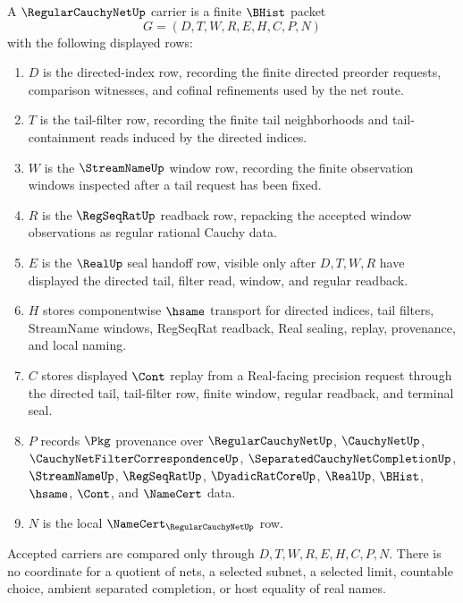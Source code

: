\begin{definition}
\label{def:regular-cauchy-net-carrier}
A $\RegularCauchyNetUp$ carrier is a finite $\BHist$ packet
$$
G=(D,T,W,R,E,H,C,P,N)
$$
with the following displayed rows:
\begin{enumerate}
\item $D$ is the directed-index row, recording the finite directed preorder requests, comparison witnesses, and cofinal refinements used by the net route.
\item $T$ is the tail-filter row, recording the finite tail neighborhoods and tail-containment reads induced by the directed indices.
\item $W$ is the $\StreamNameUp$ window row, recording the finite observation windows inspected after a tail request has been fixed.
\item $R$ is the $\RegSeqRatUp$ readback row, repacking the accepted window observations as regular rational Cauchy data.
\item $E$ is the $\RealUp$ seal handoff row, visible only after $D,T,W,R$ have displayed the directed tail, filter read, window, and regular readback.
\item $H$ stores componentwise $\hsame$ transport for directed indices, tail filters, StreamName windows, RegSeqRat readback, Real sealing, replay, provenance, and local naming.
\item $C$ stores displayed $\Cont$ replay from a Real-facing precision request through the directed tail, tail-filter row, finite window, regular readback, and terminal seal.
\item $P$ records $\Pkg$ provenance over $\RegularCauchyNetUp$, $\CauchyNetUp$, $\CauchyNetFilterCorrespondenceUp$, $\SeparatedCauchyNetCompletionUp$, $\StreamNameUp$, $\RegSeqRatUp$, $\DyadicRatCoreUp$, $\RealUp$, $\BHist$, $\hsame$, $\Cont$, and $\NameCert$ data.
\item $N$ is the local $\NameCert_{\RegularCauchyNetUp}$ row.
\end{enumerate}
Accepted carriers are compared only through $D,T,W,R,E,H,C,P,N$. There is no coordinate for a quotient of nets, a selected subnet, a selected limit, countable choice, ambient separated completion, or host equality of real names.
\end{definition}

